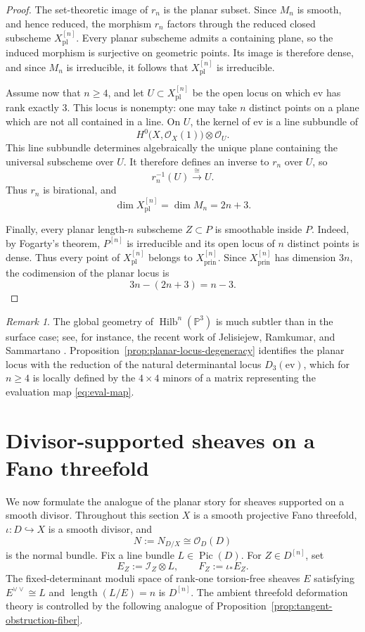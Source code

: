 \documentclass[12pt]{amsart}
\numberwithin{equation}{section}
\newcommand{\PP}{\mathbb{P}}
\newcommand{\OO}{\mathcal{O}}
\newcommand{\I}{\mathcal{I}}
\newcommand{\Hilb}{\operatorname{Hilb}}
\newcommand{\Pic}{\operatorname{Pic}}
\newcommand{\dual}{\vee}
\theoremstyle{plain}
\theoremstyle{definition}
\theoremstyle{remark}
\newtheorem{remark}[theorem]{Remark}
\begin{document}
\begin{proof}
The set-theoretic image of $r_n$ is the planar subset.
Since $M_n$ is smooth, and hence reduced, the morphism $r_n$ factors through the reduced closed subscheme $X^{[n]}_{\mathrm{pl}}$.
Every planar subscheme admits a containing plane, so the induced morphism is surjective on geometric points.
Its image is therefore dense, and since $M_n$ is irreducible, it follows that $X^{[n]}_{\mathrm{pl}}$ is irreducible.

Assume now that $n\geq 4$, and let $U\subset X^{[n]}_{\mathrm{pl}}$ be the open locus on which $\mathrm{ev}$ has rank exactly $3$.
This locus is nonempty: one may take $n$ distinct points on a plane which are not all contained in a line.
On $U$, the kernel of $\mathrm{ev}$ is a line subbundle of
\[
H^0\bigl(X,\OO_X(1)\bigr)\otimes\OO_U.
\]
This line subbundle determines algebraically the unique plane containing the universal subscheme over $U$.
It therefore defines an inverse to $r_n$ over $U$, so
\[
r_n^{-1}(U)\xrightarrow{\ \cong\ }U.
\]
Thus $r_n$ is birational, and
\[
\dim X^{[n]}_{\mathrm{pl}}=\dim M_n=2n+3.
\]

Finally, every planar length-$n$ subscheme $Z\subset P$ is smoothable inside $P$.
Indeed, by Fogarty's theorem, $P^{[n]}$ is irreducible and its open locus of $n$ distinct points is dense.
Thus every point of $X^{[n]}_{\mathrm{pl}}$ belongs to $X^{[n]}_{\mathrm{prin}}$.
Since $X^{[n]}_{\mathrm{prin}}$ has dimension $3n$, the codimension of the planar locus is
\[
3n-(2n+3)=n-3.
\]
\end{proof}

\begin{remark}\label{rem:jrs}
The global geometry of $\Hilb^n(\PP^3)$ is much subtler than in the surface case; see, for instance, the recent work of Jelisiejew, Ramkumar, and Sammartano \cite{JRS}.
Proposition~\ref{prop:planar-locus-degeneracy} identifies the planar locus with the reduction of the natural determinantal locus $D_3(\mathrm{ev})$, which for $n\geq 4$ is locally defined by the $4\times4$ minors of a matrix representing the evaluation map \eqref{eq:eval-map}.
\end{remark}

\section{Divisor-supported sheaves on a Fano threefold}\label{sec:divisors}

We now formulate the analogue of the planar story for sheaves supported on a smooth divisor.
Throughout this section $X$ is a smooth projective Fano threefold, $\iota\colon D\hookrightarrow X$ is a smooth divisor, and
\[
N:=N_{D/X}\cong \OO_D(D)
\]
is the normal bundle.
Fix a line bundle $L\in \Pic(D)$.
For $Z\in D^{[n]}$, set
\[
E_Z:=\I_Z\otimes L,
\qquad
F_Z:=\iota_*E_Z.
\]
The fixed-determinant moduli space of rank-one torsion-free sheaves $E$ satisfying $E^{\dual\dual}\cong L$ and $\operatorname{length}(L/E)=n$ is $D^{[n]}$.
The ambient threefold deformation theory is controlled by the following analogue of Proposition~\ref{prop:tangent-obstruction-fiber}.
\end{document}
